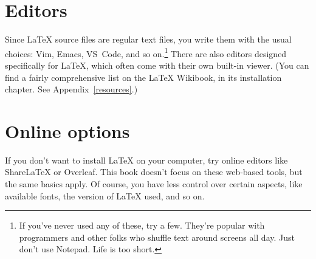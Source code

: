 \section{Editors}

Since \LaTeX{} source files are regular text files,
you write them with the usual choices: Vim, Emacs,
VS~Code, and so on.\punckern\footnote{If you've never used
any of these, try a few.
They're popular with programmers and other folks who shuffle text around
screens all day. Just don't use Notepad. Life is too short.}
There are also editors designed specifically for \LaTeX{},
which often come with their own built-in  viewer.
(You can find a fairly comprehensive list on the \LaTeX{} Wikibook,
in its installation chapter. See Appendix~\ref{resources}.)

\section{Online options}

If you don't want to install \LaTeX{} on your computer,
try online editors like Share\LaTeX{} or Overleaf.
This book doesn't focus on these web-based tools,
but the same basics apply.
Of course, you have less control over certain aspects,
like available fonts, the version of \LaTeX{} used, and so on.
